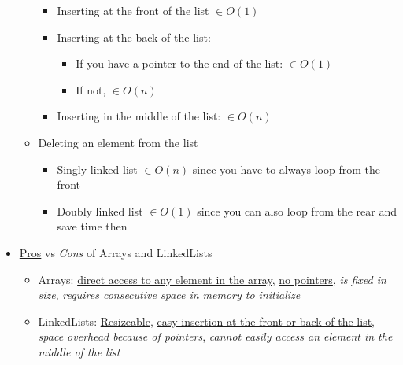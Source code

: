\documentclass{article}
\begin{document}
\begin{itemize}
\begin{itemize}
                \begin{itemize}
                    \item Inserting at the front of the list $\in O(1)$
                    \item Inserting at the back of the list:
                        \begin{itemize}
                            \item If you have a pointer to the end of the list: $\in O(1)$
                            \item If not, $\in O(n)$
                        \end{itemize}
                    \item Inserting in the middle of the list: $\in O(n)$
                \end{itemize}
            \item Deleting an element from the list
                \begin{itemize}
                    \item Singly linked list $\in O(n)$ since you have to always loop from the front
                    \item Doubly linked list $\in O(1)$ since you can also loop from the rear and save time then
                \end{itemize}
        \end{itemize}
    \item \underline{Pros} vs \textit{Cons} of Arrays and LinkedLists
    \begin{itemize}
        \item Arrays: \underline{direct access to any element in the array}, \underline{no pointers}, \textit{is fixed in size}, \textit{requires consecutive space in memory to initialize}
        \item LinkedLists: \underline{Resizeable}, \underline{easy insertion at the front or back of the list}, \textit{space overhead because of pointers}, \textit{cannot easily access an element in the middle of the list}
    \end{itemize}
\end{itemize}
\end{document}
